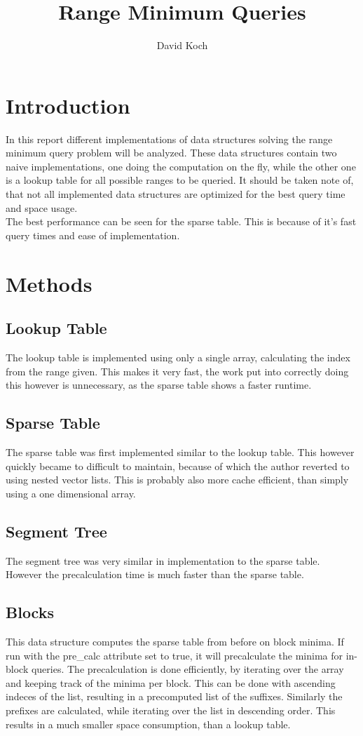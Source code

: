 \documentclass[a4paper,UKenglish,cleveref,thm-restate]{lipics-v2021}
\title{Range Minimum Queries}
\author{David Koch}{Karlsruhe Institute of Technology, Germany}{}{}{}
\begin{document}
\maketitle


\section{Introduction}
In this report different implementations of data structures solving the range minimum query problem will be analyzed. These data structures contain two naive implementations, one doing the computation on the fly, while the other one is a lookup table for all possible ranges to be queried. It should be taken note of, that not all implemented data structures are optimized for the best query time and space usage.\\
The best performance can be seen for the sparse table. This is because of it's fast query times and ease of implementation.

\section{Methods}
\subsection{Lookup Table}
The lookup table is implemented using only a single array, calculating the index from the range given. This makes it very fast, the work put into correctly doing this however is unnecessary, as the sparse table shows a faster runtime.

\subsection{Sparse Table}
The sparse table was first implemented similar to the lookup table. This however quickly became to difficult to maintain, because of which the author reverted to using nested vector lists. This is probably also more cache efficient, than simply using a one dimensional array.

\subsection{Segment Tree}
The segment tree was very similar in implementation to the sparse table. However the precalculation time is much faster than the sparse table.

\subsection{Blocks}
This data structure computes the sparse table from before on block minima. If run with the pre\_calc
attribute set to true, it will precalculate the minima for in-block queries.
The precalculation is done efficiently, by iterating over the array and keeping track of the minima per block. This can be done with ascending indeces of the list, resulting in a precomputed list of the suffixes. Similarly the prefixes are calculated, while iterating over the list in descending order.
This results in a much smaller space consumption, than a lookup table.
\end{document}
